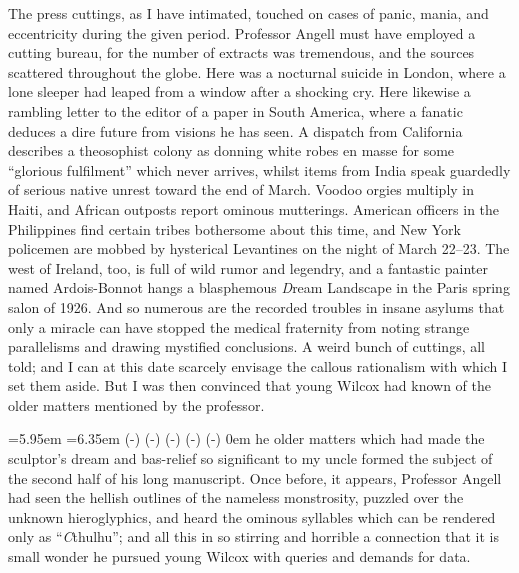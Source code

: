 The press cuttings, as I have intimated, touched on cases of panic, mania, and eccentricity during the given period. Professor Angell must have employed a cutting bureau, for the number of extracts was tremendous, and the sources scattered throughout the globe. Here was a nocturnal suicide in London, where a lone sleeper had leaped from a window after a shocking cry. Here likewise a rambling letter to the editor of a paper in South America, where a fanatic deduces a dire future from visions he has seen. A dispatch from California describes a theosophist colony as donning white robes en masse for some “glorious fulfilment” which never arrives, whilst items from India speak guardedly of serious native unrest toward the end of March. Voodoo orgies multiply in Haiti, and African outposts report ominous mutterings. American officers in the Philippines find certain tribes bothersome about this time, and New York policemen are mobbed by hysterical Levantines on the night of March 22⁠–⁠23. The west of Ireland, too, is full of wild rumor and legendry, and a fantastic painter named Ardois-Bonnot hangs a blasphemous {\emph Dream Landscape} in the Paris spring salon of 1926. And so numerous are the recorded troubles in insane asylums that only a miracle can have stopped the medical fraternity from noting strange parallelisms and drawing mystified conclusions. A weird bunch of cuttings, all told; and I can at this date scarcely envisage the callous rationalism with which I set them aside. But I was then convinced that young Wilcox had known of the older matters mentioned by the professor.
\endchapter


\baselineskip
\noindent\leavevmode
{}
\baselineskip
{}=5.95em
=6.35em
	 \dimexpr(\hsize-)
	 \dimexpr(\hsize-)
	 \dimexpr(\hsize-)
	 \dimexpr(\hsize-)
	 \dimexpr(\hsize-)
	0em \hsize
\noindent
{\sc he older matters} which had made the sculptor’s dream and bas-relief so significant to my uncle formed the subject of the second half of his long manuscript. Once before, it appears, Professor Angell had seen the hellish outlines of the nameless monstrosity, puzzled over the unknown hieroglyphics, and heard the ominous syllables which can be rendered only as “{\emph Cthulhu}”; and all this in so stirring and horrible a connection that it is small wonder he pursued young Wilcox with queries and demands for data.


